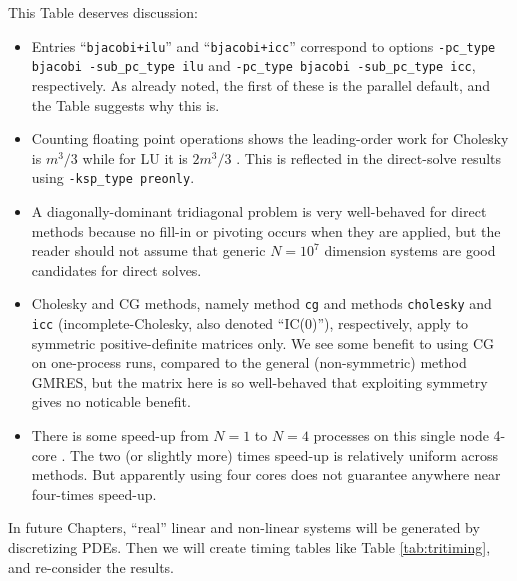 This Table deserves discussion:
\begin{itemize}
\item Entries ``\texttt{bjacobi+ilu}'' and ``\texttt{bjacobi+icc}'' correspond to options \texttt{-pc\_type bjacobi -sub\_pc\_type ilu} and \texttt{-pc\_type bjacobi -sub\_pc\_type icc}, respectively.  As already noted, the first of these is the parallel default, and the Table suggests why this is.

\item Counting floating point operations shows the leading-order work for Cholesky is $m^3/3$ while for LU it is $2 m^3/3$ \citep{TrefethenBau1997}.  This is reflected in the direct-solve results using \texttt{-ksp\_type preonly}.

\item A diagonally-dominant tridiagonal problem is very well-behaved for direct methods because no fill-in or pivoting occurs when they are applied, but the reader should not assume that generic $N=10^7$ dimension systems are good candidates for direct solves.

\item Cholesky and CG methods, namely \pKSP method \texttt{cg} and \pPC methods \texttt{cholesky} and \texttt{icc} (incomplete-Cholesky, also denoted ``IC($0$)''), respectively, apply to symmetric positive-definite matrices only.  We see some benefit to using CG on one-process runs, compared to the general (non-symmetric) method GMRES, but the matrix here is so well-behaved that exploiting symmetry gives no noticable benefit.

\item There is some speed-up from $N=1$ to $N=4$ processes on this single node 4-core \WORKSTATION.  The two (or slightly more) times speed-up is relatively uniform across methods.  But apparently using four cores does not guarantee anywhere near four-times speed-up.
\end{itemize}

In future Chapters, ``real'' linear and non-linear systems will be generated by discretizing PDEs.  Then we will create timing tables like Table \ref{tab:tritiming}, and re-consider the results.

